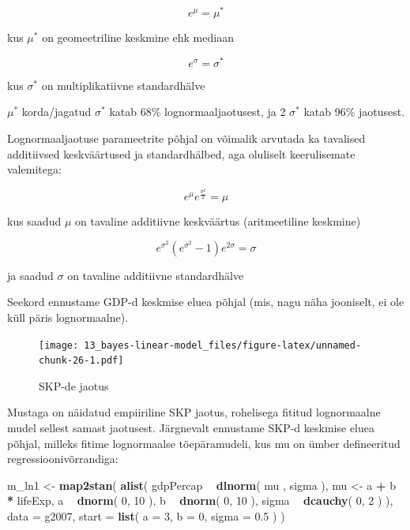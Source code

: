 \documentclass[]{book}
\newenvironment{Shaded}{\begin{snugshade}}{\end{snugshade}}
\newcommand{\DataTypeTok}[1]{\textcolor[rgb]{0.13,0.29,0.53}{#1}}
\newcommand{\DecValTok}[1]{\textcolor[rgb]{0.00,0.00,0.81}{#1}}
\newcommand{\FloatTok}[1]{\textcolor[rgb]{0.00,0.00,0.81}{#1}}
\newcommand{\KeywordTok}[1]{\textcolor[rgb]{0.13,0.29,0.53}{\textbf{#1}}}
\newcommand{\NormalTok}[1]{#1}
\newcommand{\OperatorTok}[1]{\textcolor[rgb]{0.81,0.36,0.00}{\textbf{#1}}}
\newcommand{\StringTok}[1]{\textcolor[rgb]{0.31,0.60,0.02}{#1}}
\begin{document}
\[e^\mu = \mu^*\]

kus \(\mu^*\) on geomeetriline keskmine ehk mediaan

\[e^\sigma = \sigma^*\]

kus \(\sigma^*\) on multiplikatiivne standardhälve

\(\mu^*\) korda/jagatud \(\sigma^*\) katab 68\% lognormaaljaotusest, ja 2 \(\sigma^*\) katab 96\% jaotusest.

Lognormaaljaotuse parameetrite põhjal on võimalik arvutada ka tavalised additiivsed keskväärtused ja standardhälbed, aga oluliselt keerulisemate valemitega:

\[e^\mu e^{\frac{\sigma^2}2} = \mu\]

kus saadud \(\mu\) on tavaline additiivne keskväärtus (aritmeetiline keskmine)

\[e^{\sigma^2}(e^{\sigma^2} - 1)e^{2\sigma} =\sigma\]

ja saadud \(\sigma\) on tavaline additiivne standardhälve

Seekord ennustame GDP-d keskmise eluea põhjal (mis, nagu näha jooniselt, ei ole küll päris lognormaalne).

\begin{figure}
\centering
\texttt{[image: 13\_bayes-linear-model\_files/figure-latex/unnamed-chunk-26-1.pdf]}
\caption{\label{fig:unnamed-chunk-26}SKP-de jaotus}
\end{figure}

Mustaga on näidatud empiiriline SKP jaotus, rohelisega fititud lognormaalne mudel sellest samast jaotusest. Järgnevalt ennustame SKP-d keskmise eluea põhjal, milleks fitime lognormaalse tõepäramudeli, kus mu on ümber defineeritud regressioonivõrrandiga:

\begin{Shaded}
\begin{Highlighting}[]
\NormalTok{m_ln1 <-}\StringTok{ }\KeywordTok{map2stan}\NormalTok{(}
  \KeywordTok{alist}\NormalTok{(}
\NormalTok{   gdpPercap  }\OperatorTok{~}\StringTok{ }\KeywordTok{dlnorm}\NormalTok{( mu , sigma ),}
\NormalTok{    mu <-}\StringTok{ }\NormalTok{a }\OperatorTok{+}\StringTok{ }\NormalTok{b }\OperatorTok{*}\StringTok{ }\NormalTok{lifeExp,}
\NormalTok{    a }\OperatorTok{~}\StringTok{ }\KeywordTok{dnorm}\NormalTok{( }\DecValTok{0}\NormalTok{, }\DecValTok{10}\NormalTok{ ),}
\NormalTok{    b }\OperatorTok{~}\StringTok{ }\KeywordTok{dnorm}\NormalTok{( }\DecValTok{0}\NormalTok{, }\DecValTok{10}\NormalTok{ ),}
\NormalTok{    sigma }\OperatorTok{~}\StringTok{ }\KeywordTok{dcauchy}\NormalTok{( }\DecValTok{0}\NormalTok{, }\DecValTok{2}\NormalTok{ ) }
\NormalTok{   ), }
  \DataTypeTok{data =}\NormalTok{ g2007, }
  \DataTypeTok{start =} \KeywordTok{list}\NormalTok{( }\DataTypeTok{a =} \DecValTok{3}\NormalTok{, }\DataTypeTok{b =} \DecValTok{0}\NormalTok{, }\DataTypeTok{sigma =} \FloatTok{0.5}\NormalTok{ ) }
\NormalTok{  )}
\end{Highlighting}
\end{Shaded}
\end{document}
